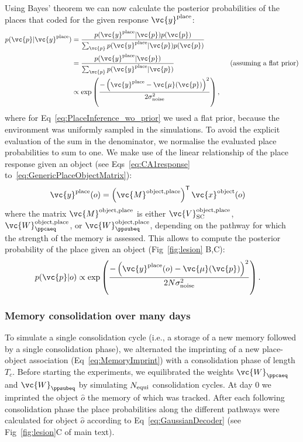 Using Bayes' theorem we can now calculate the posterior probabilities of the places that coded for the given response $\vc{y}^{\mathrm{place}}$:
\begin{align}
p(\vc{p}|\vc{y}^{\mathrm{place}}) &= \frac{p(\vc{y}^{\mathrm{place}}|\vc{p}) p(\vc{p})}{\sum_{\vc{p}} p(\vc{y}^{\mathrm{place}}|\vc{p}) p(\vc{p})} \\
		&= \frac{p(\vc{y}^{\mathrm{place}}|\vc{p})}{\sum_{\vc{p}} p(\vc{y}^{\mathrm{place}}|\vc{p})} \label{eq:PlaceInference_wo_prior} \qquad \qquad \qquad \qquad \textrm{(assuming a flat prior)} \\
		 &\propto \mathrm{exp} \left( \frac{- \left(\vc{y}^{\mathrm{place}} - \vc{\mu}(\vc{p}) \right)^2}{2 \sigma_{\rm{noise}}^2} \right),
\end{align}
where for Eq~\eqref{eq:PlaceInference_wo_prior} we used a flat prior, because the environment was uniformly sampled in the simulations. To avoid the explicit evaluation of the sum in the denominator, we normalise the evaluated place probabilities to sum to one.
We make use of the linear relationship of the place response given an object (see Eqs~\eqref{eq:CA1response} to~\eqref{eq:GenericPlaceObjectMatrix}):
\begin{align}
\vc{y}^{\rm place}(o) & = \left(\vc{M}^{\mathrm{object}, \mathrm{place}}\right)^\mathsf{T} \vc{x}^{\mathrm{object}}(o) %
\end{align}
where the matrix $\vc{M}^{\mathrm{object}, \mathrm{place}}$ is either $\vc{V}_{\rm SC}^{\mathrm{object}, \mathrm{place}}$, $\vc{W}_{\ppcaeq}^{\mathrm{object}, \mathrm{place}}$, or $\vc{W}_{\ppsubeq}^{\mathrm{object}, \mathrm{place}}$, depending on the pathway for which the strength of the memory is assessed.
This allows to compute the posterior probability of the place given an object (Fig~\ref{fig:lesion} B,C):
\begin{align}
 p(\vc{p} | o) &\propto \mathrm{exp} \left( \frac{- \left( \vc{y}^{\rm place}(o) - \vc{\mu}(\vc{p}) \right)^2}{2N\sigma_{\rm noise}^2} \right) \label{eq:GaussianDecoder}.
\end{align}

\subsubsection{Memory consolidation over many days}
To simulate a single consolidation cycle (i.e., a storage of a new memory followed by a single consolidation phase), we alternated the imprinting of a new place-object association (Eq~\eqref{eq:MemoryImprint}) with a consolidation phase of length $T_c$. Before starting the experiments, we equilibrated the weights $\vc{W}_{\ppcaeq}$ and $\vc{W}_{\ppsubeq}$ by simulating $N_{\rm equi}$ consolidation cycles. At day $0$ we imprinted the object $\hat o$ the memory of which was tracked. After each following consolidation phase the place probabilities along the different pathways were calculated for object $\hat o$ according to Eq~\eqref{eq:GaussianDecoder} (see Fig~\ref{fig:lesion}C of main text).


